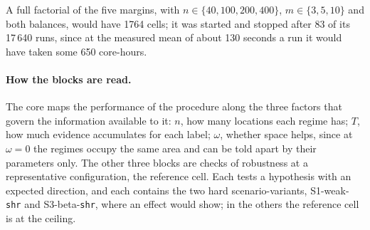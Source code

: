 \documentclass[11pt]{article}
\begin{document}
A full factorial of the five margins, with $n \in \{40, 100, 200, 400\}$, $m \in \{3, 5, 10\}$ and both balances, would have 1764 cells; it was started and stopped after 83 of its 17\,640 runs, since at the measured mean of about 130 seconds a run it would have taken some 650 core-hours.

\paragraph{How the blocks are read.} The core maps the performance of the procedure along the three factors that govern the information available to it: $n$, how many locations each regime has; $T$, how much evidence accumulates for each label; $\omega$, whether space helps, since at $\omega = 0$ the regimes occupy the same area and can be told apart by their parameters only. The other three blocks are checks of robustness at a representative configuration, the reference cell. Each tests a hypothesis with an expected direction, and each contains the two hard scenario-variants, S1-weak-\texttt{shr} and S3-beta-\texttt{shr}, where an effect would show; in the others the reference cell is at the ceiling.
\end{document}
